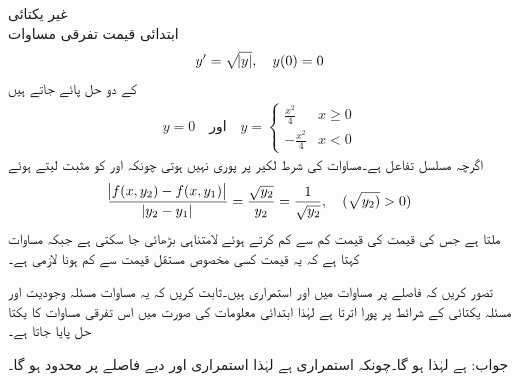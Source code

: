 \quad غیر یکتائی\\
ابتدائی قیمت تفرقی مساوات
\begin{align*}
y'=\sqrt{\abs{y}},\quad y(0)=0
\end{align*}
کے دو حل پائے جاتے ہیں
\begin{align*}
y=0 \quad \text{اور} \quad y=\begin{cases} \frac{x^2}{4} & x \ge 0\\ -\frac{x^2}{4} & x <0   \end{cases}
\end{align*}
اگرچہ  مسلسل تفاعل ہے۔مساوات  کی شرط لکیر  پر پوری نہیں ہوتی چونکہ  اور  کو مثبت لیتے ہوئے 
\begin{align*}
\frac{\abs{f(x,y_2)-f(x,y_1)}}{\abs{y_2-y_1}}=\frac{\sqrt{y_2}}{y_2}=\frac{1}{\sqrt{y_2}}, \quad (\sqrt{y_2)} >0)
\end{align*}
ملتا ہے جس کی قیمت  کی قیمت کم سے کم کرتے ہوئے لامتناہی بڑھائی جا سکتی ہے جبکہ مساوات  کہتا ہے کہ یہ قیمت کسی مخصوص مستقل قیمت  سے کم ہونا لازمی ہے۔


تصور کریں کہ  فاصلے پر مساوات  میں  اور  استمراری ہیں۔ثابت کریں کہ یہ مساوات  مسئلہ وجودیت اور مسئلہ یکتائی کے شرائط پر پورا اترتا ہے لہٰذا ابتدائی معلومات کی صورت میں اس تفرقی مساوات کا یکتا حل پایا جاتا ہے۔

جواب: ہے لہٰذا  ہو گا۔چونکہ  استمراری ہے لہٰذا   استمراری اور دیے فاصلے پر محدود ہو گا۔
